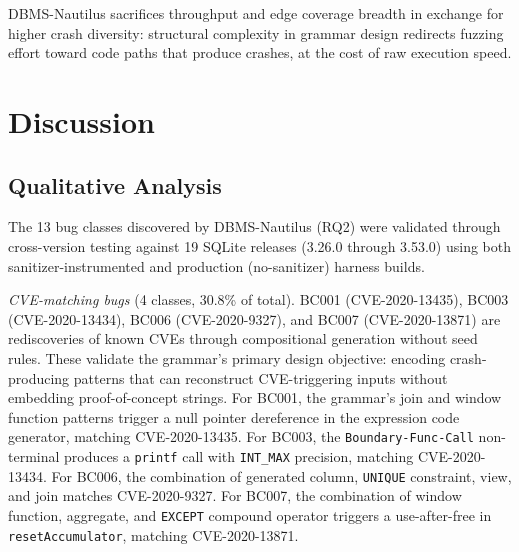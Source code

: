 DBMS-Nautilus sacrifices throughput and edge coverage breadth in exchange for higher crash diversity: structural complexity in grammar design redirects fuzzing effort toward code paths that produce crashes, at the cost of raw execution speed.

\vspace{0.5em}
\noindent{}
\vspace{0.5em}


\section{Discussion}
\label{sec:discussion}

\subsection{Qualitative Analysis}
\label{sec:qualitative}

The 13 bug classes discovered by DBMS-Nautilus (RQ2) were validated through cross-version testing against 19 SQLite releases (3.26.0 through 3.53.0) using both sanitizer-instrumented and production (no-sanitizer) harness builds.

\emph{CVE-matching bugs} (4 classes, 30.8\% of total). BC001 (CVE-2020-13435), BC003 (CVE-2020-13434), BC006 (CVE-2020-9327), and BC007 (CVE-2020-13871) are rediscoveries of known CVEs through compositional generation without seed rules. These validate the grammar's primary design objective: encoding crash-producing patterns that can reconstruct CVE-triggering inputs without embedding proof-of-concept strings. For BC001, the grammar's join and window function patterns trigger a null pointer dereference in the expression code generator, matching CVE-2020-13435. For BC003, the \texttt{Boundary-Func-Call} non-terminal produces a \texttt{printf} call with \texttt{INT\_MAX} precision, matching CVE-2020-13434. For BC006, the combination of generated column, \texttt{UNIQUE} constraint, view, and join matches CVE-2020-9327. For BC007, the combination of window function, aggregate, and \texttt{EXCEPT} compound operator triggers a use-after-free in \texttt{resetAccumulator}, matching CVE-2020-13871.

